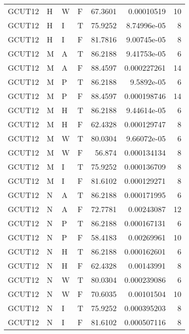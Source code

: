 \begin{table}[htb!]
{\begin{tabular}{llllrrr}
            GCUT12   & H     & W     & F          & 67.3601    & 0.00010519  & 10       \\
            GCUT12   & H     & I     & T          & 75.9252    & 8.74996e-05 & 8        \\
            GCUT12   & H     & I     & F          & 81.7816    & 9.00745e-05 & 8        \\
            GCUT12   & M     & A     & T          & 86.2188    & 9.41753e-05 & 6        \\
            GCUT12   & M     & A     & F          & 88.4597    & 0.000227261 & 14       \\
            GCUT12   & M     & P     & T          & 86.2188    & 9.5892e-05  & 6        \\
            GCUT12   & M     & P     & F          & 88.4597    & 0.000198746 & 14       \\
            GCUT12   & M     & H     & T          & 86.2188    & 9.44614e-05 & 6        \\
            GCUT12   & M     & H     & F          & 62.4328    & 0.000129747 & 8        \\
            GCUT12   & M     & W     & T          & 80.0304    & 9.66072e-05 & 6        \\
            GCUT12   & M     & W     & F          & 56.874     & 0.000134134 & 8        \\
            GCUT12   & M     & I     & T          & 75.9252    & 0.000136709 & 8        \\
            GCUT12   & M     & I     & F          & 81.6102    & 0.000129271 & 8        \\
            GCUT12   & N     & A     & T          & 86.2188    & 0.000171995 & 6        \\
            GCUT12   & N     & A     & F          & 72.7781    & 0.00243087  & 12       \\
            GCUT12   & N     & P     & T          & 86.2188    & 0.000167131 & 6        \\
            GCUT12   & N     & P     & F          & 58.4183    & 0.00269961  & 10       \\
            GCUT12   & N     & H     & T          & 86.2188    & 0.000162601 & 6        \\
            GCUT12   & N     & H     & F          & 62.4328    & 0.00143991  & 8        \\
            GCUT12   & N     & W     & T          & 80.0304    & 0.000239086 & 6        \\
            GCUT12   & N     & W     & F          & 70.6035    & 0.00101504  & 10       \\
            GCUT12   & N     & I     & T          & 75.9252    & 0.000395203 & 8        \\
            GCUT12   & N     & I     & F          & 81.6102    & 0.000507116 & 8        \\
            \hline
        \end{tabular}
    }{
    }
\end{table} 
